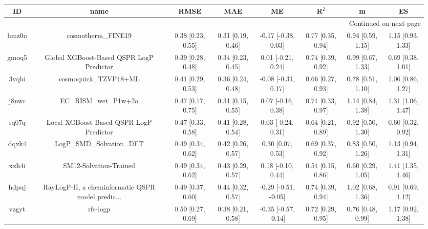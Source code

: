 \documentclass{article}
\begin{document}
\begin{center}
\begin{longtable}{|cccccccc|}
\toprule
    ID &                                               name &               RMSE &                MAE &                    ME &              R$^2$ &                    m &                    ES \\
\midrule
\endhead
\midrule
\multicolumn{8}{r}{{Continued on next page}} \\
\midrule
\endfoot

\bottomrule
\endlastfoot
 hmz0n &                                 cosmotherm\_FINE19 &  0.38 [0.23, 0.55] &  0.31 [0.19, 0.46] &   -0.17 [-0.38, 0.03] &  0.77 [0.35, 0.94] &    0.94 [0.59, 1.15] &     1.15 [0.93, 1.33] \\
 gmoq5 &           Global XGBoost-Based QSPR LogP Predictor &  0.39 [0.28, 0.48] &  0.34 [0.23, 0.45] &    0.01 [-0.21, 0.24] &  0.74 [0.39, 0.92] &    0.99 [0.67, 1.33] &     0.69 [0.38, 1.01] \\
 3vqbi &                              cosmoquick\_TZVP18+ML &  0.41 [0.29, 0.53] &  0.36 [0.24, 0.48] &   -0.08 [-0.31, 0.17] &  0.66 [0.27, 0.93] &    0.78 [0.51, 1.10] &     1.06 [0.86, 1.27] \\
 j8nwc &                              EC\_RISM\_wet\_P1w+2o &  0.47 [0.17, 0.75] &  0.31 [0.15, 0.55] &    0.07 [-0.16, 0.38] &  0.74 [0.33, 0.97] &    1.14 [0.84, 1.38] &     1.31 [1.06, 1.47] \\
 sq07q &            Local XGBoost-Based QSPR LogP Predictor &  0.47 [0.33, 0.58] &  0.41 [0.28, 0.54] &    0.03 [-0.24, 0.31] &  0.64 [0.21, 0.89] &    0.92 [0.50, 1.30] &     0.60 [0.32, 0.92] \\
 dqxk4 &                          LogP\_SMD\_Solvation\_DFT &  0.49 [0.34, 0.62] &  0.42 [0.26, 0.57] &     0.30 [0.07, 0.53] &  0.69 [0.37, 0.92] &    0.83 [0.50, 1.26] &     1.13 [0.94, 1.31] \\
 xxh4i &                             SM12-Solvation-Trained &  0.49 [0.34, 0.62] &  0.43 [0.29, 0.57] &    0.18 [-0.10, 0.44] &  0.54 [0.15, 0.86] &    0.60 [0.29, 1.05] &     1.41 [1.35, 1.46] \\
 hdpuj &  RayLogP-II, a cheminformatic QSPR model predic... &  0.49 [0.37, 0.60] &  0.44 [0.32, 0.57] &  -0.29 [-0.51, -0.05] &  0.74 [0.39, 0.94] &    1.02 [0.68, 1.36] &     0.91 [0.69, 1.12] \\
 vzgyt &                                           rfs-logp &  0.50 [0.27, 0.69] &  0.38 [0.21, 0.58] &  -0.35 [-0.57, -0.14] &  0.72 [0.29, 0.95] &    0.76 [0.48, 0.99] &     1.17 [0.92, 1.38] \\

\end{longtable}
\end{center}
\end{document}
